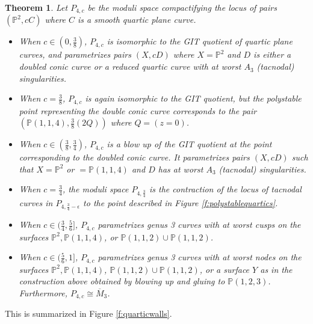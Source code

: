 \documentclass[11pt]{amsart}
\numberwithin{equation}{section}
\newtheorem{theorem}{Theorem}[section]
\theoremstyle{definition}
\newcommand{\bP}{\mathbb{P}}
\begin{document}
\begin{theorem}
    Let $P_{4,c}$ be the moduli space compactifying the locus of pairs $(\bP^2, cC)$ where $C$ is a smooth quartic plane curve.
        \begin{itemize}
            \item When $c \in (0, \frac{3}{8})$, $P_{4,c}$ is isomorphic to the GIT quotient of quartic plane curves, and parametrizes pairs $(X,cD)$ where $X = \bP^2$ and $D$ is either a doubled conic curve or a reduced quartic curve with at worst $A_3$ (tacnodal) singularities. 
            \item When $c = \frac{3}{8}$, $P_{4,c}$ is again isomorphic to the GIT quotient, but the polystable point representing the double conic curve corresponds to the pair $(\bP(1,1,4), \frac{3}{8} (2Q))$ where $Q = (z =0)$. 
            \item When $c \in (\frac{3}{8}, \frac{3}{4})$, $P_{4,c}$ is a blow up of the GIT quotient at the point corresponding to the doubled conic curve.  It parametrizes pairs $(X,cD)$ such that $X = \bP^2$ or $= \bP(1,1,4)$ and $D$ has at worst $A_3$ (tacnodal) singularities. 
            \item When $c = \frac{3}{4}$, the moduli space $P_{4, \frac{3}{4}}$ is the contraction of the locus of tacnodal curves in $P_{4, \frac{3}{4} - \epsilon}$ to the point described in Figure \ref{f:polystablequartics}.
            \item When $c \in (\frac{3}{4}, \frac{5}{6}]$, $P_{4,c}$ parametrizes genus 3 curves with at worst cusps on the surfaces $\bP^2, \bP(1,1,4)$, or $\bP(1,1,2) \cup \bP(1,1,2)$. 
            \item When $c \in (\frac{5}{6},1]$, $P_{4,c}$ parametrizes genus 3 curves with at worst nodes on the surfaces $\bP^2, \bP(1,1,4)$, $\bP(1,1,2) \cup \bP(1,1,2)$, or a surface $Y$ as in the construction above obtained by blowing up and gluing to $\bP(1,2,3)$.  Furthermore, $P_{4,c} \cong \overline{M}_3$.
        \end{itemize}
\end{theorem}

This is summarized in Figure \ref{f:quarticwalls}.
\end{document}
